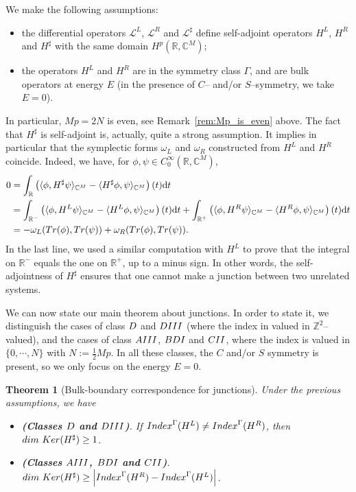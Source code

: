 \documentclass[11pt]{amsart}
\numberwithin{equation}{section} %
\newtheorem{theorem}{Theorem}[section]
\newcommand\1{{\mathds 1}}
\def\C{{\mathbb C}}
\def\R{{\mathbb R}}
\def\Z{{\mathbb Z}}
\def\rd{{\mathrm{d}}}
\def\cL{{\mathcal L}}
\def\rAIII{{\rm AIII}}
\def\rBDI{{\rm BDI}}
\def\rD{{\rm D}}
\def\rDIII{{\rm DIII}}
\def\rCII{{\rm CII}}
\def\Index{{\rm Index}}
\def\bra{\langle}
\def\ket{\rangle}
\def\Tr{{\rm Tr}}
\def\Ker{{\rm Ker }}
\def\dim{{\rm dim }}
\begin{document}
\medskip
We make the following assumptions:
\begin{itemize}
    \item the differential operators $\cL^L$, $\cL^R$ and $\cL^\sharp$ define self-adjoint operators $H^L$, $H^R$ and $H^\sharp$ with the same domain $H^p(\R, \C^M)$; 
    \item the operators $H^L$ and $H^R$ are in the symmetry class $\Gamma$, and are bulk operators at energy $E$ (in the presence of $C$-- and/or $S$--symmetry, we take $E = 0$).
\end{itemize}
In particular, $Mp = 2N$ is even, see Remark~\ref{rem:Mp_is_even} above. The fact that $H^\sharp$ is self-adjoint is, actually, quite a strong assumption. It implies in particular that the symplectic forms $\omega_L$ and $\omega_R$ constructed from $H^L$ and $H^R$ coincide. Indeed, we have, for $\phi, \psi \in C^\infty_0(\R, \C^M)$,
\begin{align}
    0 & = \int_\R \left( \bra \phi, H^\sharp \psi \ket_{\C^M} - \bra  H^\sharp \phi, \psi \ket_{\C^M} \right)(t) \rd t \nonumber \\
    & = \int_{\R^-} \left( \bra \phi, H^L \psi \ket_{\C^M} - \bra H^L  \phi, \psi \ket_{\C^M} \right)(t) \rd t + \int_{\R^+} \left( \bra \phi, H^R \psi \ket_{\C^M} - \bra H^R \phi,  \psi \ket_{\C^M} \right)(t) \rd t \nonumber \\
    & = - \omega_L(\Tr(\phi), \Tr(\psi)) + \omega_R(\Tr(\phi), \Tr(\psi)). \label{eq:omegaL_omegaR}
\end{align}
In the last line, we used a similar computation with $H^L$ to prove that the integral on $\R^-$ equals the one on $\R^+$, up to a minus sign. In other words, the self-adjointness of $H^\sharp$ ensures that one cannot make a junction between two unrelated systems.

\medskip

We can now state our main theorem about junctions. In order to state it, we distinguish the cases of class $\rD$ and $\rDIII$ (where the index in valued in $\Z^2$--valued), and the cases of class $\rAIII$, $\rBDI$ and $\rCII$, where the index is valued in $\{ 0, \cdots, N\}$ with $N := \frac12 Mp$. In all these classes, the $C$ and/or $S$ symmetry is present, so we only focus on the energy $E = 0$.

\begin{theorem}[Bulk-boundary correspondence for junctions] \label{thm:BEC} Under the previous assumptions, we have
    \begin{itemize}
        \item {\bf (Classes $\rD$ and $\rDIII$)}. If $\Index^\Gamma(H^L) \neq \Index^\Gamma(H^R)$, then  $\dim \ \Ker (H^\sharp) \ge 1$.
        \item {\bf (Classes $\rAIII$, $\rBDI$ and $\rCII$)}. $\dim \ \Ker (H^\sharp) \ge \left| \Index^\Gamma(H^R) - \Index^\Gamma(H^L) \right|$.
    \end{itemize}
\end{theorem}
\end{document}
